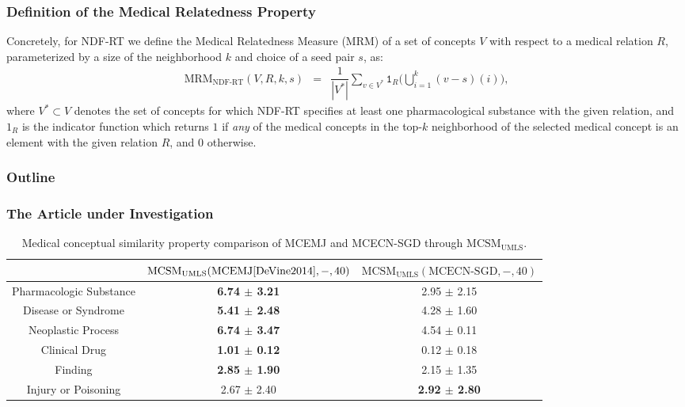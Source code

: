 \documentclass{beamer}
\newcommand\T{\rule{0pt}{2.6ex}}       %
\newcommand\B{\rule[-1.2ex]{0pt}{0pt}} %
\begin{document}
\begin{frame}
\frametitle{Definition of 
the Medical Relatedness Property}
Concretely, for NDF-RT we define the Medical Relatedness Measure (MRM) of a set
of concepts $V$ 
with respect to a medical relation $R$, parameterized by
a size of the neighborhood $k$ and choice of a seed pair $s$, as: %
\begin{eqnarray*}
\text{MRM}_{\text{NDF-RT}}(V,R,k,s) &=& \dfrac{1}{|V^*|}\sum_{v \in V^*} \mathtt{1}_{R}\Big(\bigcup_{i=1}^{k}(v-s)(i)\Big),
\end{eqnarray*}
where $V^*\subset V$ denotes the set of concepts for which NDF-RT
specifies at least one pharmacological substance with the given
relation, and $1_{R}$ is the indicator function which returns $1$ if
{\em any} of the medical concepts in the top-$k$ neighborhood of the
selected medical concept is an element with the given relation $R$, and  
$0$ otherwise. 
\end{frame}
\begin{frame}
\frametitle{Outline}
\end{frame}
\begin{frame}
\frametitle{The Article under Investigation}
\begin{table}[h!]
\begin{center}
\caption{\centering \scriptsize 
Medical conceptual similarity property comparison of MCEMJ and MCECN-SGD through  
$\text{MCSM}_{\text{UMLS}}$.} 
{
\tiny
\begin{tabular}{|c|c|c|}
    \hline      
                      & 
$\text{MCSM}_{\text{UMLS}}(\text{MCEMJ\cite{DeVine2014}},-,40)$ & 
$\text{MCSM}_{\text{UMLS}}(\text{MCECN-SGD},-,40)$\\ 
    \hline
    Pharmacologic Substance & {\bf 6.74 $\pm$ 3.21}  &  2.95 $\pm$ 2.15 \T \B  \\
    \hline
    Disease or Syndrome     & {\bf 5.41 $\pm$ 2.48}  &  4.28 $\pm$ 1.60 \T \B \\
    \hline
    Neoplastic Process      & {\bf 6.74 $\pm$ 3.47}  &  4.54 $\pm$ 0.11  \T \B \\
    \hline
    Clinical Drug           & {\bf 1.01 $\pm$ 0.12}  &  0.12 $\pm$ 0.18  \T \B \\
    \hline
    Finding                 & {\bf 2.85 $\pm$ 1.90}  &  2.15 $\pm$ 1.35  \T \B \\
    \hline
    Injury or Poisoning     & 2.67 $\pm$ 2.40  &  {\bf 2.92 $\pm$ 2.80}  \T \B \\
    \hline
\end{tabular}
}
\end{center}
\label{umls_dcg}
\end{table}

\end{frame}
\end{document}
